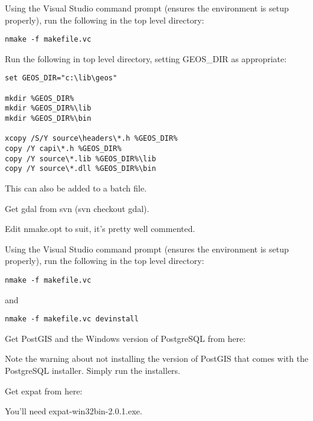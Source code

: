 Using the Visual Studio command prompt (ensures the environment is setup properly), run the following in the top level directory:

\begin{verbatim}
nmake -f makefile.vc 
\end{verbatim}

Run the following in top level directory, setting GEOS\_DIR as appropriate:

\begin{verbatim}
set GEOS_DIR="c:\lib\geos"

mkdir %GEOS_DIR%
mkdir %GEOS_DIR%\lib
mkdir %GEOS_DIR%\bin

xcopy /S/Y source\headers\*.h %GEOS_DIR%
copy /Y capi\*.h %GEOS_DIR%
copy /Y source\*.lib %GEOS_DIR%\lib
copy /Y source\*.dll %GEOS_DIR%\bin
\end{verbatim}

This can also be added to a batch file.

Get gdal from svn (svn checkout  gdal).

Edit nmake.opt to suit, it's pretty well commented.

Using the Visual Studio command prompt (ensures the environment is setup properly), run the following in the top level directory:

\begin{verbatim}
nmake -f makefile.vc 
\end{verbatim}

and

\begin{verbatim}
nmake -f makefile.vc devinstall 
\end{verbatim}

Get PostGIS and the Windows version of PostgreSQL from here:

	\begin{quotation}
	\end{quotation}
Note the warning about not installing the version of PostGIS that comes with the PostgreSQL installer. Simply run the installers.

Get expat from here:

	\begin{quotation}
	\end{quotation}
You'll need expat-win32bin-2.0.1.exe.

